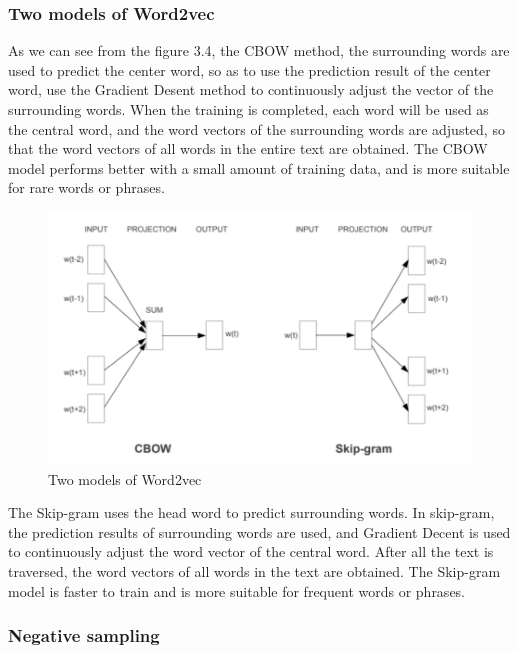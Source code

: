 \subsubsection{Two models of Word2vec}

\noindent As we can see from the figure 3.4, the CBOW method, the surrounding words are used to predict the center word, so as to use the prediction result of the center word, use the Gradient Desent method to continuously adjust the vector of the surrounding words. When the training is completed, each word will be used as the central word, and the word vectors of the surrounding words are adjusted, so that the word vectors of all words in the entire text are obtained. The CBOW model performs better with a small amount of training data, and is more suitable for rare words or phrases.\\

\begin{figure}[ht]

\centering
\includegraphics[scale=0.85]{images/image_largevis_word2vec.PNG}
\caption{Two models of Word2vec}
\label{fig:label}
\end{figure}

\noindent The Skip-gram uses the head word to predict surrounding words. In skip-gram, the prediction results of surrounding words are used, and Gradient Decent is used to continuously adjust the word vector of the central word. After all the text is traversed, the word vectors of all words in the text are obtained. The Skip-gram model is faster to train and is more suitable for frequent words or phrases.\\


\subsubsection{Negative sampling}

